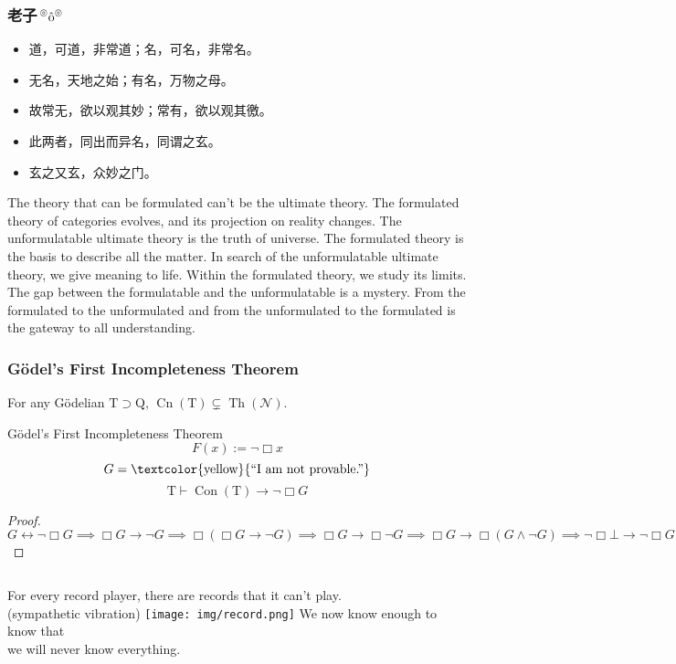 \documentclass[UTF8,aspectratio=43,11pt,colorlinks,compress,openany]{beamer}%
\begin{document}
\begin{frame}\frametitle{老子$\sideset{^\circledcirc}{^\circledcirc}{\operatorname{\hat{o}}}$}
\begin{itemize}
	\item 道，可道，非常道；名，可名，非常名。
	\item 无名，天地之始；有名，万物之母。
	\item 故常无，欲以观其妙；常有，欲以观其徼。
	\item 此两者，同出而异名，同谓之玄。
	\item 玄之又玄，众妙之门。
\end{itemize}
\begin{block}{}
	The theory that can be formulated can't be the ultimate theory. The formulated theory of categories evolves, and its projection on reality changes. The unformulatable ultimate theory is the truth of universe. The formulated theory is the basis to describe all the matter. In search of the unformulatable ultimate theory, we give meaning to life. Within the formulated theory, we study its limits. The gap between the formulatable and the unformulatable is a mystery. From the formulated to the unformulated and from the unformulated to the formulated is the gateway to all understanding.
\end{block}
\end{frame}

\begin{frame}\frametitle{G\"odel's First Incompleteness Theorem}
\setlength\abovedisplayskip{0pt}
\setlength\belowdisplayskip{0pt}
	\begin{theorem}
		For any G\"odelian $\mathrm{T}\supset \mathrm{Q}$, $\operatorname{Cn}(\mathrm{T})\subsetneq \operatorname{Th}(\mathcal{N})$.
	\end{theorem}
	\begin{block}{G\"odel's First Incompleteness Theorem}
		\[F(x):=\neg\Box x\]
		\[G=\text{\textcolor{yellow}{``I am not provable.''}}\]
		\[\mathrm{T}\vdash\operatorname{Con}(\mathrm{T})\to\neg\Box G\]
	\end{block}
\begin{proof}
$G\leftrightarrow\neg\Box G\implies\Box G\to\neg G\implies\Box(\Box G\to\neg G)\implies\Box G\to\Box\neg G\implies\Box G\to\Box(G\wedge\neg G)\implies\neg\Box\bot\to\neg\Box G$
\end{proof}
\begin{columns}
	{\footnotesize For every record player, there are records that it can't play.\\(sympathetic vibration)}
		\texttt{[image: img/record.png]}
	{\large We now know enough to know that\\ we will never know everything.}
\end{columns}
\end{frame}
\end{document}
